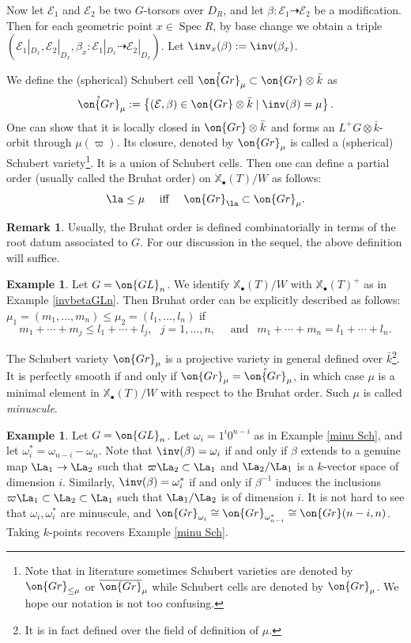 \documentclass[11pt]{amsart}
\theoremstyle{definition}
\theoremstyle{definition}
\newtheorem{ex}[thm]{Example}
\newtheorem{rmk}[thm]{Remark}
\theoremstyle{definition}
\numberwithin{equation}{subsection}
\newcommand{\mE}{{\mathcal E}}
\newcommand{\Gr}{{\on{Gr}}}
\DeclareMathOperator{\Spec}{Spec}
\newcommand{\GL}{{\on{GL}}}
\def\xcoch{\mathbb{X}_\bullet}
\begin{document}
Now let $\mE_1$ and $\mE_2$ be two $G$-torsors over $D_R$, and let
$\beta: \mE_1\dashrightarrow \mE_2$ be a modification.
Then for each geometric point $x\in \Spec R$, by base change we obtain a triple $(\mE_1|_{D_x},\mE_2|_{D_x},\beta_x: \mE_1|_{D_x}\dashrightarrow \mE_2|_{D_x})$. Let $\inv_x(\beta):=\inv(\beta_x)$.

We define the (spherical) Schubert cell $\mathring{\Gr}_{\mu}\subset \Gr\otimes \bar k$ as
\[\mathring{\Gr}_\mu:=\left\{(\mE,\beta)\in \Gr\otimes \bar k\mid \inv(\beta)=\mu\right\}.\]
One can show that it is locally closed in $\Gr\otimes \bar k$ and forms an $L^+G\otimes \bar k$-orbit through $\mu(\varpi)$. Its closure, denoted by $\Gr_\mu$ is called a (spherical) Schubert variety\footnote{Note that in literature sometimes Schubert varieties are denoted by $\Gr_{\leq\mu}$ or $\overline{\Gr}_\mu$ while Schubert cells are denoted by $\Gr_\mu$. We hope our notation is not too confusing.}. It is a union of Schubert cells. Then one can define a partial order (usually called the Bruhat order) on $\xcoch(T)/W$ as follows:
\[\la\leq \mu \quad \mbox{ iff } \quad \Gr_{\la}\subset \Gr_\mu.\]
\begin{rmk}
Usually, the Bruhat order is defined combinatorially in terms of the root datum associated to $G$. For our discussion in the sequel, the above definition will suffice.
\end{rmk}
\begin{ex}
Let $G=\GL_n$. We identify $\xcoch(T)/W$ with $\xcoch(T)^+$ as in Example \ref{invbetaGLn}. 
Then Bruhat order can be explicitly described as follows: $\mu_1=(m_1,\ldots,m_n)\leq \mu_2=(l_1,\ldots,l_n)$ if 
$$m_1+\cdots+m_j\leq l_1+\cdots+l_j, \ \ \ j=1,\ldots, n, \quad \mbox{ and }\ \ m_1+\cdots+m_n=l_1+\cdots+l_n.$$ 
\end{ex}

The Schubert variety $\Gr_\mu$ is a projective variety in general defined over $\bar k$\footnote{It is in fact defined over the field of definition of $\mu$.}. It is perfectly smooth if and only if $\Gr_\mu=\mathring{\Gr}_\mu$, in which case $\mu$ is a minimal element in $\xcoch(T)/W$ with respect to the Bruhat order. Such $\mu$ is called \emph{minuscule}.


\begin{ex}
Let $G=\GL_n$. Let $\omega_i=1^i0^{n-i}$ as in Example \ref{minu Sch}, and let $\omega_i^*=\omega_{n-i}-\omega_{n}$. 
Note that  $\inv(\beta)=\omega_i$ if and only if $\beta$ extends to a genuine map $\La_1\to \La_2$  such that $\varpi \La_2\subset \La_1$ and $\La_2/\La_1$ is a $k$-vector space of dimension $i$. Similarly, $\inv(\beta)=\omega_i^*$ if and only if $\beta^{-1}$ induces the inclusions $\varpi \La_1\subset \La_2\subset \La_1$ such that $\La_1/\La_2$ is of dimension $i$.
It is not hard to see that $\omega_i,\omega_i^*$ are minuscule, and $\Gr_{\omega_i}\cong \Gr_{\omega_{n-i}^*}\cong \Gr(n-i,n)$. Taking $k$-points recovers Example \ref{minu Sch}. 
\end{ex}
\end{document}
